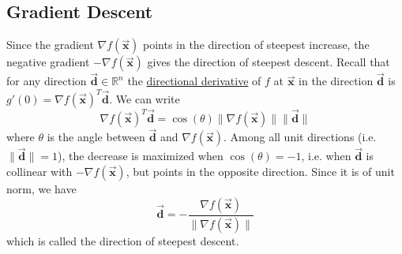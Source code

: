 \documentclass[9pt, headings=standardclasses, parskip=half]{scrartcl}
\renewcommand{\emph}[1]{\textcolor{mypurple}{#1}}
\newcommand{\vect}[1]{\vec{\boldsymbol{#1}}}
\begin{document}
\subsection{Gradient Descent}
\label{subsec:gradient_descent}
\begin{center}
\end{center}

Since the gradient \(\nabla f(\vect{x})\) points in the direction of steepest increase, the negative gradient \(-\nabla f(\vect{x})\) gives the direction of steepest descent. 
Recall that for any direction \(\vect{d}\in\mathbb{R}^{n}\) the \hyperlink{directional_derivative}{directional derivative} of \(f\) at \(\vect{x}\) in the direction \(\vect{d}\) is
\(
g'(0)=\nabla f(\vect{x})^{T}\vect{d}
\). We can write 
\[
\nabla f(\vect{x})^{T}\vect{d} = \cos(\theta)\|\nabla f(\vect{x})\| \|\vect{d}\| 
\]
where \(\theta\) is the angle between \(\vect{d}\) and \(\nabla f(\vect{x})\).
Among all unit directions (i.e. \(\|\vect{d}\|=1\)), the decrease is maximized when \(\cos(\theta)=-1\), i.e. when \(\vect{d}\) is collinear with \(-\nabla f(\vect{x})\), but points in the opposite direction. 
Since it is of unit norm, we have
\[
\vect{d}=-\frac{\nabla f(\vect{x})}{\|\nabla f(\vect{x})\|}
\] 
which is called the \emph{direction of steepest descent}.
\end{document}
